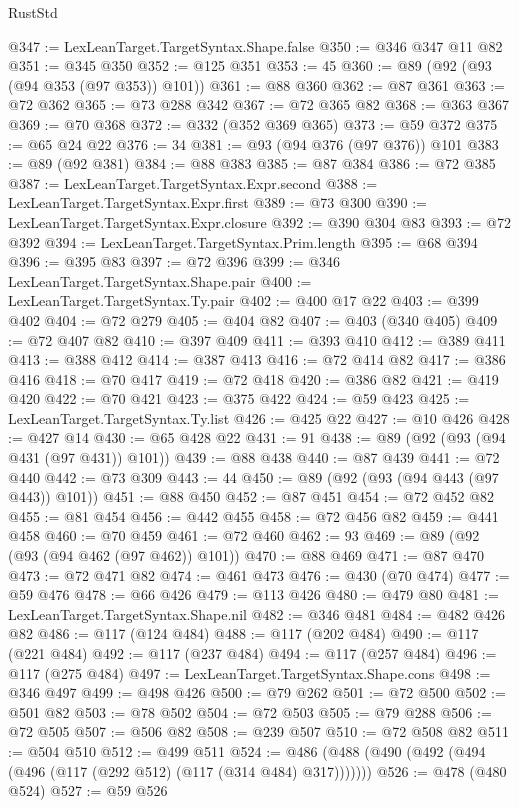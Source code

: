 \begin{lexlean}{RustStd}
\begin{coremodule}
{\begin{coremodule}
{{{{{{{{{{{{{{{{{{{{{{{{{{{{{{{{{{{{{{{{{{{{{{{{{{{{{{{@347 := LexLeanTarget.TargetSyntax.Shape.false
@350 := @346 @347 @11 @82
@351 := @345 @350
@352 := @125 @351
@353 := 45
@360 := @89 (@92 (@93 (@94 @353 (@97 @353)) @101))
@361 := @88 @360
@362 := @87 @361
@363 := @72 @362
@365 := @73 @288 @342
@367 := @72 @365 @82
@368 := @363 @367
@369 := @70 @368
@372 := @332 (@352 @369 @365)
@373 := @59 @372
@375 := @65 @24 @22
@376 := 34
@381 := @93 (@94 @376 (@97 @376)) @101
@383 := @89 (@92 @381)
@384 := @88 @383
@385 := @87 @384
@386 := @72 @385
@387 := LexLeanTarget.TargetSyntax.Expr.second
@388 := LexLeanTarget.TargetSyntax.Expr.first
@389 := @73 @300
@390 := LexLeanTarget.TargetSyntax.Expr.closure
@392 := @390 @304 @83
@393 := @72 @392
@394 := LexLeanTarget.TargetSyntax.Prim.length
@395 := @68 @394
@396 := @395 @83
@397 := @72 @396
@399 := @346 LexLeanTarget.TargetSyntax.Shape.pair
@400 := LexLeanTarget.TargetSyntax.Ty.pair
@402 := @400 @17 @22
@403 := @399 @402
@404 := @72 @279
@405 := @404 @82
@407 := @403 (@340 @405)
@409 := @72 @407 @82
@410 := @397 @409
@411 := @393 @410
@412 := @389 @411
@413 := @388 @412
@414 := @387 @413
@416 := @72 @414 @82
@417 := @386 @416
@418 := @70 @417
@419 := @72 @418
@420 := @386 @82
@421 := @419 @420
@422 := @70 @421
@423 := @375 @422
@424 := @59 @423
@425 := LexLeanTarget.TargetSyntax.Ty.list
@426 := @425 @22
@427 := @10 @426
@428 := @427 @14
@430 := @65 @428 @22
@431 := 91
@438 := @89 (@92 (@93 (@94 @431 (@97 @431)) @101))
@439 := @88 @438
@440 := @87 @439
@441 := @72 @440
@442 := @73 @309
@443 := 44
@450 := @89 (@92 (@93 (@94 @443 (@97 @443)) @101))
@451 := @88 @450
@452 := @87 @451
@454 := @72 @452 @82
@455 := @81 @454
@456 := @442 @455
@458 := @72 @456 @82
@459 := @441 @458
@460 := @70 @459
@461 := @72 @460
@462 := 93
@469 := @89 (@92 (@93 (@94 @462 (@97 @462)) @101))
@470 := @88 @469
@471 := @87 @470
@473 := @72 @471 @82
@474 := @461 @473
@476 := @430 (@70 @474)
@477 := @59 @476
@478 := @66 @426
@479 := @113 @426
@480 := @479 @80
@481 := LexLeanTarget.TargetSyntax.Shape.nil
@482 := @346 @481
@484 := @482 @426 @82
@486 := @117 (@124 @484)
@488 := @117 (@202 @484)
@490 := @117 (@221 @484)
@492 := @117 (@237 @484)
@494 := @117 (@257 @484)
@496 := @117 (@275 @484)
@497 := LexLeanTarget.TargetSyntax.Shape.cons
@498 := @346 @497
@499 := @498 @426
@500 := @79 @262
@501 := @72 @500
@502 := @501 @82
@503 := @78 @502
@504 := @72 @503
@505 := @79 @288
@506 := @72 @505
@507 := @506 @82
@508 := @239 @507
@510 := @72 @508 @82
@511 := @504 @510
@512 := @499 @511
@524 := @486 (@488 (@490 (@492 (@494 (@496 (@117 (@292 @512) (@117 (@314 @484) @317)))))))
@526 := @478 (@480 @524)
@527 := @59 @526
}}}}}}}}}}}}}}}}}}}}}}}}}}}}}}}}}}}}}}}}}}}}}}}}}}}}}}}
\end{coremodule}}
\end{coremodule}
\end{lexlean}
